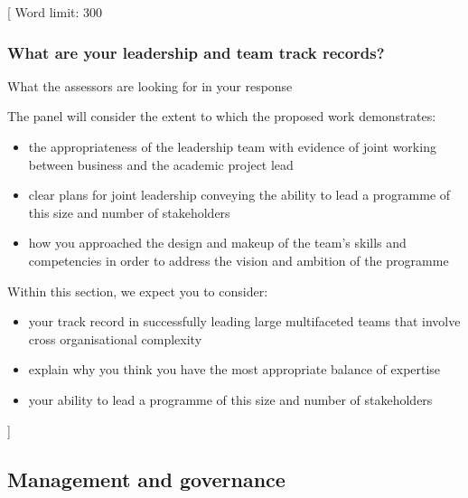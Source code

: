 \documentclass{article}
\newcommand{\desc}[1]{{\leavevmode\color{blue}[#1]}}
\begin{document}
\desc{
Word limit: 300

\subsubsection*{What are your leadership and team track records?}

What the assessors are looking for in your response

The panel will consider the extent to which the proposed work demonstrates:

\begin{itemize}

    \item the appropriateness of the leadership team with evidence of joint
        working between business and the academic project lead

    \item clear plans for joint leadership conveying the ability to lead a
        programme of this size and number of stakeholders

    \item how you approached the design and makeup of the team’s skills and
        competencies in order to address the vision and ambition of the
        programme

\end{itemize}

Within this section, we expect you to consider:

\begin{itemize}

    \item your track record in successfully leading large multifaceted teams that involve
cross organisational complexity

    \item explain why you think you have the most appropriate balance of expertise

    \item your ability to lead a programme of this size and number of stakeholders
\end{itemize}

}

% 

\subsection{Management and governance}
\end{document}

